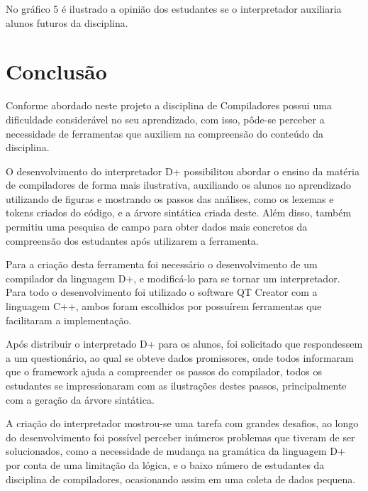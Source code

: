 \documentclass[12pt,oneside,a4paper,chapter=TITLE,section=TITLE,sumario=tradicional]{abntex2}
\begin{document}
No gráfico 5 é ilustrado a opinião dos estudantes se o interpretador auxiliaria alunos futuros da disciplina.

\begin{grafico}[H]
\end{grafico}

\chapter{Conclusão}
\label{cap:conclusao}

Conforme abordado neste projeto a disciplina de Compiladores possui uma dificuldade considerável no seu aprendizado, com isso, pôde-se perceber a necessidade de ferramentas que auxiliem na compreensão do conteúdo da disciplina.

O desenvolvimento do interpretador D+ possibilitou abordar o ensino da matéria de compiladores de forma mais ilustrativa, auxiliando os alunos no aprendizado utilizando de figuras e mostrando os passos das análises, como os lexemas e tokens criados do código, e a árvore sintática criada deste. Além disso, também permitiu uma pesquisa de campo para obter dados mais concretos da compreensão dos estudantes após utilizarem a ferramenta.

Para a criação desta ferramenta foi necessário o desenvolvimento de um compilador da linguagem D+, e modificá-lo para se tornar um interpretador. Para todo o desenvolvimento foi utilizado o software QT Creator com a linguagem C++, ambos foram escolhidos por possuírem ferramentas que facilitaram a implementação.

Após distribuir o interpretado D+ para os alunos, foi solicitado que respondessem a um questionário, ao qual se obteve dados promissores, onde todos informaram que o framework ajuda a compreender os passos do compilador, todos os estudantes se impressionaram com as ilustrações destes passos, principalmente com a geração da árvore sintática.

A criação do interpretador mostrou-se uma tarefa com grandes desafios, ao longo do desenvolvimento foi possível perceber inúmeros problemas que tiveram de ser solucionados, como a necessidade de mudança na gramática da linguagem D+ por conta de uma limitação da lógica, e o baixo número de estudantes da disciplina de compiladores, ocasionando assim em uma coleta de dados pequena.
\end{document}
